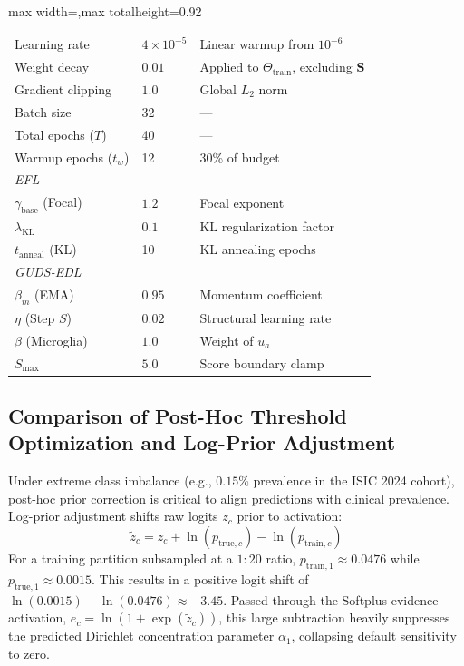 \documentclass[letterpaper]{article} %
\begin{document}
\begin{table}[t]
\begin{adjustbox}{max width=\columnwidth,max totalheight=0.92\textheight}
\begin{tabular}{@{}p{}p{}p{}@{}}
Learning rate & $4 \times 10^{-5}$ & Linear warmup from $10^{-6}$ \\
Weight decay & $0.01$ & Applied to $\Theta_{\text{train}}$, excluding $\bm{S}$ \\
Gradient clipping & $1.0$ & Global $L_2$ norm \\
Batch size & 32 & --- \\
Total epochs ($T$) & 40 & --- \\
Warmup epochs ($t_w$) & 12 & 30\% of budget \\
\midrule
\multicolumn{3}{l}{\emph{EFL}} \\
$\gamma_{\text{base}}$ (Focal) & $1.2$ & Focal exponent \\
$\lambda_{\text{KL}}$ & $0.1$ & KL regularization factor \\
$t_{\text{anneal}}$ (KL) & 10 & KL annealing epochs \\
\midrule
\multicolumn{3}{l}{\emph{GUDS-EDL}} \\
$\beta_m$ (EMA) & $0.95$ & Momentum coefficient \\
$\eta$ (Step $S$) & $0.02$ & Structural learning rate \\
$\beta$ (Microglia) & $1.0$ & Weight of $u_a$ \\
$S_{\max}$ & $5.0$ & Score boundary clamp \\
\bottomrule
\end{tabular}
\end{adjustbox}
\end{table}


\subsection{Comparison of Post-Hoc Threshold Optimization and Log-Prior Adjustment}\label{subsec:log_prior}
Under extreme class imbalance (e.g., $0.15\%$ prevalence in the ISIC 2024 cohort), post-hoc prior correction is critical to align predictions with clinical prevalence. Log-prior adjustment \cite{menon2021long} shifts raw logits $z_c$ prior to activation:
\begin{equation}
    \tilde{z}_c = z_c + \ln(p_{\text{true}, c}) - \ln(p_{\text{train}, c})
\end{equation}
For a training partition subsampled at a $1:20$ ratio, $p_{\text{train}, 1} \approx 0.0476$ while $p_{\text{true}, 1} \approx 0.0015$. This results in a positive logit shift of $\ln(0.0015) - \ln(0.0476) \approx -3.45$. Passed through the Softplus evidence activation, $e_c = \ln(1 + \exp(\tilde{z}_c))$, this large subtraction heavily suppresses the predicted Dirichlet concentration parameter $\alpha_1$, collapsing default sensitivity to zero.
\end{document}
